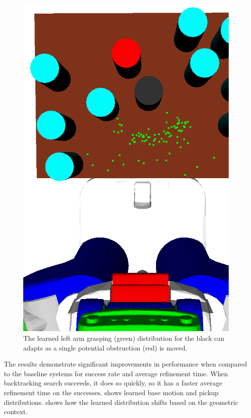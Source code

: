 \begin{figure}[t]
    \includegraphics[scale=0.13]{images/grasp_context_3.png}
  \caption{\small{The learned left arm grasping (green) distribution
      for the black can adapts as a single potential obstruction (red) is
      moved.}}
  \label{fig:context}
\end{figure}

The results demonstrate significant improvements in performance when
compared to the baseline systems for success rate and average refinement time. When backtracking
search succeeds, it does so quickly, so it has a faster average
refinement time on the successes.  shows learned
base motion and pickup distributions.  shows how
the learned distribution shifts based on the geometric context.

